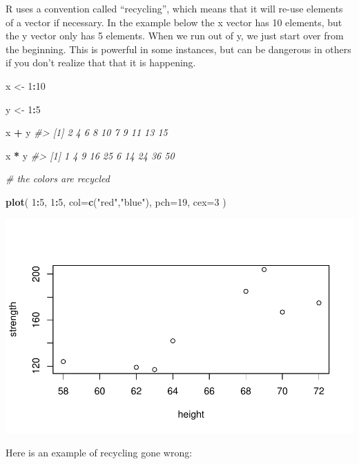 \documentclass[]{book}
\newenvironment{Shaded}{\begin{snugshade}}{\end{snugshade}}
\newcommand{\CommentTok}[1]{\textcolor[rgb]{0.56,0.35,0.01}{\textit{#1}}}
\newcommand{\DataTypeTok}[1]{\textcolor[rgb]{0.13,0.29,0.53}{#1}}
\newcommand{\DecValTok}[1]{\textcolor[rgb]{0.00,0.00,0.81}{#1}}
\newcommand{\KeywordTok}[1]{\textcolor[rgb]{0.13,0.29,0.53}{\textbf{#1}}}
\newcommand{\NormalTok}[1]{#1}
\newcommand{\OperatorTok}[1]{\textcolor[rgb]{0.81,0.36,0.00}{\textbf{#1}}}
\newcommand{\StringTok}[1]{\textcolor[rgb]{0.31,0.60,0.02}{#1}}
\theoremstyle{definition}
\theoremstyle{definition}
\theoremstyle{definition}
\theoremstyle{remark}
\begin{document}
R uses a convention called ``recycling'', which means that it will
re-use elements of a vector if necessary. In the example below the x
vector has 10 elements, but the y vector only has 5 elements. When we
run out of y, we just start over from the beginning. This is powerful in
some instances, but can be dangerous in others if you don't realize that
that it is happening.

\begin{Shaded}
\begin{Highlighting}[]

\NormalTok{x <-}\StringTok{ }\DecValTok{1}\OperatorTok{:}\DecValTok{10}

\NormalTok{y <-}\StringTok{ }\DecValTok{1}\OperatorTok{:}\DecValTok{5}

\NormalTok{x }\OperatorTok{+}\StringTok{ }\NormalTok{y}
\CommentTok{#>  [1]  2  4  6  8 10  7  9 11 13 15}

\NormalTok{x }\OperatorTok{*}\StringTok{ }\NormalTok{y}
\CommentTok{#>  [1]  1  4  9 16 25  6 14 24 36 50}

\CommentTok{# the colors are recycled}

\KeywordTok{plot}\NormalTok{( }\DecValTok{1}\OperatorTok{:}\DecValTok{5}\NormalTok{, }\DecValTok{1}\OperatorTok{:}\DecValTok{5}\NormalTok{, }\DataTypeTok{col=}\KeywordTok{c}\NormalTok{(}\StringTok{"red"}\NormalTok{,}\StringTok{"blue"}\NormalTok{), }\DataTypeTok{pch=}\DecValTok{19}\NormalTok{, }\DataTypeTok{cex=}\DecValTok{3}\NormalTok{ )}
\end{Highlighting}
\end{Shaded}

\begin{center}\includegraphics[width=0.7\linewidth]{DS4PS-I_files/figure-latex/unnamed-chunk-64-1} \end{center}

Here is an example of recycling gone wrong:
\end{document}
